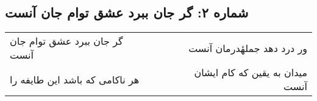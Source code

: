 \begin{center}
\section*{شماره ۲: گر جان ببرد عشق توام جان آنست}
\label{sec:002}
\begin{longtable}{l p{0.5cm} r}
گر جان ببرد عشق توام جان آنست
&&
ور درد دهد جملهٔدرمان آنست
\\
هر ناکامی که باشد این طایفه را
&&
میدان به یقین که کام ایشان آنست
\\
\end{longtable}
\end{center}
